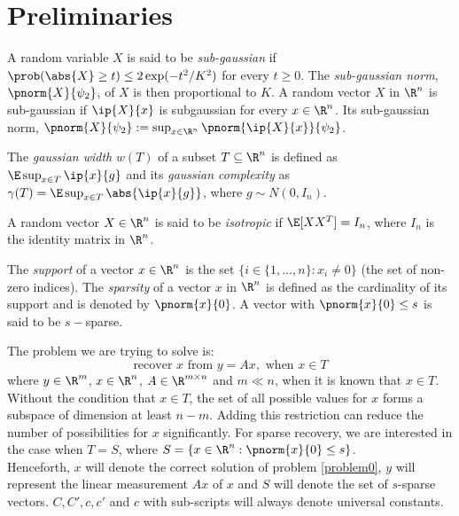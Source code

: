 \section{Preliminaries}
\begin{definition}
	A random variable $X$ is said to be \emph{sub-gaussian}
	if $\prob(\abs{X}\geq t)\leq 2\exp(-t^2/K^2)$ for
	every $t\geq 0$. The \emph{sub-gaussian norm}, $\pnorm{X}{\psi_2}$,
	of $X$ is then proportional to $K$.
	A random vector $X$ in $\R^n$ is sub-gaussian if
	$\ip{X}{x}$ is subgaussian for every $x\in\R^n$. Its
	sub-gaussian norm, $\pnorm{X}{\psi_2} := \sup_{x\in\R^n}
	\pnorm{\ip{X}{x}}{\psi_2}$.
\end{definition}

\begin{definition}
	The \emph{gaussian width} $w(T)$ of a subset $T\subseteq \R^n$ is
	defined as $\E\sup_{x\in T}\ip{x}{g}$ and its \emph{gaussian
	complexity} as $\gamma(T) = \E\sup_{x\in T}\abs{\ip{x}{g}}$,
	where $g\sim N(0, I_n)$.
\end{definition}

\begin{definition}
	A random vector $X \in \R^n$ is said to
	be \emph{isotropic} if $\E[XX^T] = I_n$, where
	$I_n$ is the identity matrix in $\R^n$.
\end{definition}

\begin{definition}[Sparsity]
	The \emph{support} of a vector $x\in \R^n$ is the set
	$\{i\in\{1,\ldots,n\}: x_i\neq 0\}$ (the set of non-zero indices).
	The \emph{sparsity} of a vector $x$ in $\R^n$ is defined as the
	cardinality of its support and is denoted by $\pnorm{x}{0}$.
	A vector with $\pnorm{x}{0}\leq s$ is said to be $s-$sparse.
\end{definition}
The problem we are trying to solve is:
\begin{equation}\label{problem0}
	\text{recover }x\text{ from }y = Ax,\text{ when }x\in T
\end{equation}
where $y\in\R^m$, $x\in\R^n$, $A\in\R^{m\times n}$ and $m\ll n$, when
it is known that $x\in T$.
Without the condition that $x\in T$, the set of all possible values for $x$
forms a subspace of dimension at least $n-m$.
Adding this restriction can reduce the number of possibilities for $x$
significantly. For sparse recovery, we are interested in the case when
$T = S$, where $S = \{x\in\R^n: \pnorm{x}{0}\leq s\}$.\\

Henceforth, $x$ will denote the correct solution of problem \eqref{problem0},
$y$ will represent the linear measurement $Ax$ of $x$ and $S$
will denote the set of $s$-sparse vectors.
$C, C', c, c'$ and $c$ with sub-scripts will always denote universal
constants.
